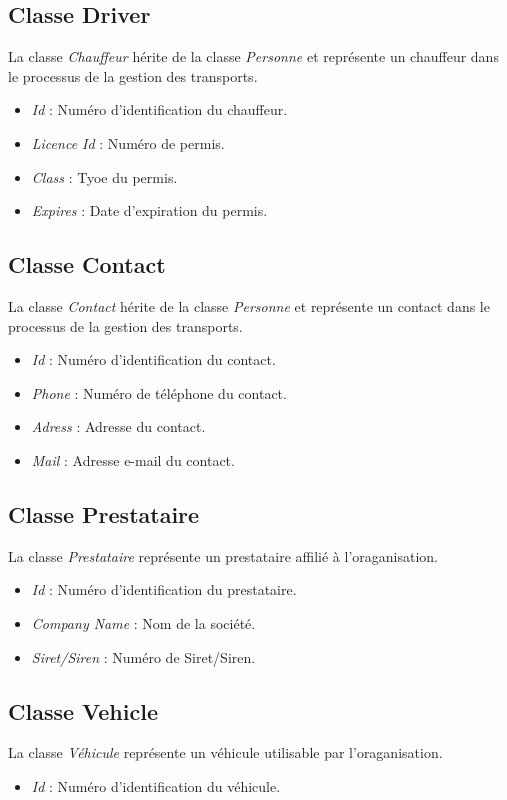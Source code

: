 \subsection{Classe Driver}
La classe \textit{Chauffeur} hérite de la classe \textit{Personne} et représente un chauffeur dans le processus de la gestion des transports.
\begin{itemize}
	\item \textit{Id} : Numéro d'identification du chauffeur.
	\item \textit{Licence Id} : Numéro de permis.
	\item \textit{Class} :	Tyoe du permis.
	\item \textit{Expires} : Date d'expiration du permis.
\end{itemize}

\subsection{Classe Contact}
La classe \textit{Contact} hérite de la classe \textit{Personne} et représente un contact dans le processus de la gestion des transports.
\begin{itemize}
	\item \textit{Id} : Numéro d'identification du contact.
	\item \textit{Phone} :	Numéro de téléphone du contact.
	\item \textit{Adress} : Adresse du contact.
	\item \textit{Mail} : Adresse e-mail du contact.
\end{itemize}

\subsection{Classe Prestataire}
La classe \textit{Prestataire} représente un prestataire affilié à l'oraganisation.
\begin{itemize}
	\item \textit{Id} : Numéro d'identification du prestataire.
	\item \textit{Company Name} : Nom de la société.
	\item \textit{Siret/Siren} : Numéro de Siret/Siren.
\end{itemize}

\subsection{Classe Vehicle}
La classe \textit{Véhicule} représente un véhicule utilisable par l'oraganisation.
\begin{itemize}
	\item \textit{Id} : Numéro d'identification du véhicule.
\end{itemize}


